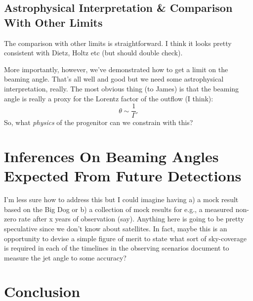 \documentclass[twocolumn,nofootinbib]{revtex4}
\begin{document}
\subsection{Astrophysical Interpretation \& Comparison With Other Limits}
The comparison with other limits is straightforward.  I think it looks pretty
consistent with Dietz, Holtz etc (but should double check).

More importantly, however,  we've demonstrated how to get a limit on the beaming
angle.  That's all well and good but we need some astrophysical interpretation,
really.  The most obvious thing (to James) is that the beaming angle is really a
proxy for the Lorentz factor of the outflow (I think):
%
\begin{equation}
\theta \sim \frac{1}{\Gamma}.
\end{equation}
%
So, what \emph{physics} of the progenitor can we constrain with this?

\section{Inferences On Beaming Angles Expected From Future Detections}
I'm less sure how to address this but I could imagine having a) a mock result
based on the Big Dog or b) a collection of mock results for e.g., a measured
non-zero rate after x years of observation (say).  Anything here is going to be
pretty speculative since we don't know about satellites.  In fact, maybe this is
an opportunity to devise a simple figure of merit to state what sort of
sky-coverage is required in each of the timelines in the observing scenarios
document to measure the jet angle to some accuracy?

\section{Conclusion}


\end{document}
